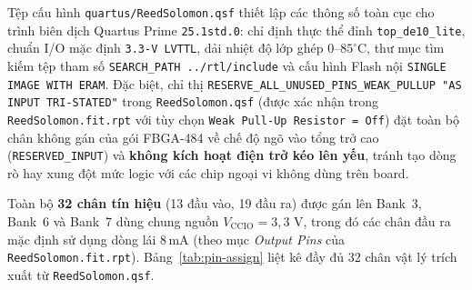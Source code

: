 \documentclass[11pt,a4paper]{report}
\begin{document}
Tệp cấu hình \texttt{quartus/ReedSolomon.qsf} thiết lập các thông số toàn cục cho trình biên dịch Quartus Prime \texttt{25.1std.0}: chỉ định thực thể đỉnh \texttt{top\_de10\_lite}, chuẩn I/O mặc định \texttt{3.3-V LVTTL}, dải nhiệt độ lớp ghép $0\text{--}85^{\circ}\text{C}$, thư mục tìm kiếm tệp tham số \texttt{SEARCH\_PATH ../rtl/include} và cấu hình Flash nội \texttt{SINGLE IMAGE WITH ERAM}. Đặc biệt, chỉ thị \texttt{RESERVE\_ALL\_UNUSED\_PINS\_WEAK\_PULLUP "AS INPUT TRI-STATED"} trong \texttt{ReedSolomon.qsf} (được xác nhận trong \texttt{ReedSolomon.fit.rpt} với tùy chọn \texttt{Weak Pull-Up Resistor = Off}) đặt toàn bộ chân không gán của gói FBGA-484 về chế độ ngõ vào tổng trở cao (\texttt{RESERVED\_INPUT}) và \textbf{không kích hoạt điện trở kéo lên yếu}, tránh tạo dòng rò hay xung đột mức logic với các chip ngoại vi không dùng trên board.

Toàn bộ \textbf{32 chân tín hiệu} (13 đầu vào, 19 đầu ra) được gán lên Bank~3, Bank~6 và Bank~7 dùng chung nguồn $V_{\text{CCIO}} = 3{,}3\text{ V}$, trong đó các chân đầu ra mặc định sử dụng dòng lái 8\,mA (theo mục \textit{Output Pins} của \texttt{ReedSolomon.fit.rpt}). Bảng~\ref{tab:pin-assign} liệt kê đầy đủ 32 chân vật lý trích xuất từ \texttt{ReedSolomon.qsf}.
\end{document}
